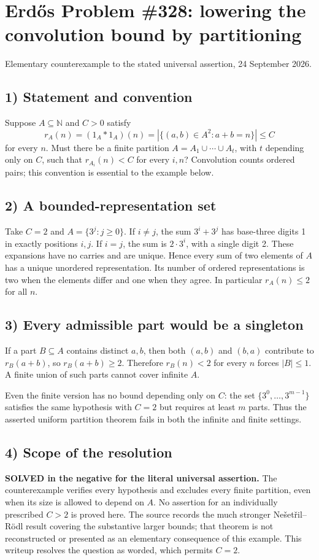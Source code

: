 \section{Erd\H{o}s Problem \#328: lowering the convolution bound by partitioning}
\noindent Elementary counterexample to the stated universal assertion, 24 September 2026.

\subsection*{1) Statement and convention}
Suppose $A\subseteq\mathbb N$ and $C>0$ satisfy
\[r_A(n)=(1_A*1_A)(n)=|\{(a,b)\in A^2:a+b=n\}|\le C
\]
for every $n$. Must there be a finite partition $A=A_1\cup\cdots\cup A_t$, with $t$ depending only on $C$, such that $r_{A_i}(n)<C$ for every $i,n$? Convolution counts ordered pairs; this convention is essential to the example below.

\subsection*{2) A bounded-representation set}
Take $C=2$ and $A=\{3^j:j\ge0\}$. If $i\ne j$, the sum $3^i+3^j$ has base-three digits 1 in exactly positions $i,j$. If $i=j$, the sum is $2\cdot3^i$, with a single digit 2. These expansions have no carries and are unique. Hence every sum of two elements of $A$ has a unique unordered representation. Its number of ordered representations is two when the elements differ and one when they agree. In particular $r_A(n)\le2$ for all $n$.

\subsection*{3) Every admissible part would be a singleton}
If a part $B\subseteq A$ contains distinct $a,b$, then both $(a,b)$ and $(b,a)$ contribute to $r_B(a+b)$, so $r_B(a+b)\ge2$. Therefore $r_B(n)<2$ for every $n$ forces $|B|\le1$. A finite union of such parts cannot cover infinite $A$.

Even the finite version has no bound depending only on $C$: the set $\{3^0,\ldots,3^{m-1}\}$ satisfies the same hypothesis with $C=2$ but requires at least $m$ parts. Thus the asserted uniform partition theorem fails in both the infinite and finite settings.

\subsection*{4) Scope of the resolution}
\textbf{SOLVED in the negative for the literal universal assertion.} The counterexample verifies every hypothesis and excludes every finite partition, even when its size is allowed to depend on $A$. No assertion for an individually prescribed $C>2$ is proved here. The source records the much stronger Ne\v{s}et\v{r}il--R\"odl result covering the substantive larger bounds; that theorem is not reconstructed or presented as an elementary consequence of this example. This writeup resolves the question as worded, which permits $C=2$.

